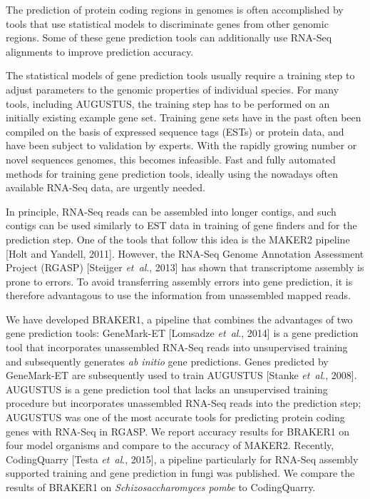 \documentclass{bioinfo}
\begin{document}
The prediction of protein coding regions in genomes is often accomplished by tools that use statistical models to discriminate genes from other genomic regions. Some of these gene prediction tools can additionally use RNA-Seq alignments to improve prediction accuracy.

The statistical models of gene prediction tools usually require a training  step to adjust parameters to the genomic properties of individual species. For many tools, including AUGUSTUS, the training step has to be performed on an initially existing example gene set. Training gene sets have in the past often been compiled on the basis of expressed sequence tags (ESTs) or protein data, and have been subject to validation by experts. With the rapidly growing number or novel sequences genomes, this becomes infeasible. Fast and fully automated methods for training gene prediction tools, ideally using the nowadays often available RNA-Seq data, are urgently needed.

In principle, RNA-Seq reads can be assembled into longer contigs, and such contigs can be used similarly to EST data in training of gene finders and for the prediction step. One of the tools that follow this idea is the MAKER2 pipeline [Holt and Yandell, 2011]. However, the RNA-Seq Genome Annotation Assessment Project (RGASP) [Steijger {\it et~al}., 2013] has shown that transcriptome assembly is prone to errors. To avoid transferring assembly errors into gene prediction, it is therefore advantagous to use the information from unassembled mapped reads.

We have developed BRAKER1, a pipeline that combines the advantages of two gene prediction tools: GeneMark-ET [Lomsadze {\it et~al}., 2014] is a gene prediction tool that incorporates unassembled RNA-Seq reads into unsupervised training and subsequently generates \textit{ab initio} gene predictions.  Genes predicted by GeneMark-ET are subsequently used to train AUGUSTUS [Stanke \textit{et~al}., 2008]. AUGUSTUS is a gene prediction tool that lacks an unsupervised training procedure but incorporates unassembled RNA-Seq reads into the prediction step; AUGUSTUS was one of the most accurate tools for predicting protein coding genes with RNA-Seq in RGASP. We report accuracy results for BRAKER1 on four model organisms and compare to the accuracy of MAKER2. Recently, CodingQuarry [Testa \textit{et~al}., 2015], a pipeline particularly for RNA-Seq assembly supported training and gene prediction in fungi was published. We compare the results of BRAKER1 on \textit{Schizosaccharomyces pombe} to CodingQuarry.
\end{document}
